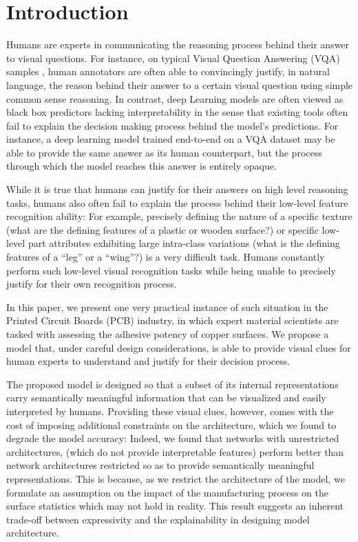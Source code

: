 \documentclass[10pt,twocolumn,letterpaper]{article}
\begin{document}
\section{Introduction}

Humans are experts in communicating the reasoning process behind their answer to visual questions.
For instance, on typical Visual Question Answering (VQA) samples \cite{agrawal:2015}\cite{zhang2016yin}\cite{goyal2017making}, 
human annotators are often able to convincingly justify, in natural language, the reason 
behind their answer to a certain visual question using simple common sense reasoning.
In contrast, deep Learning models are often viewed as black box predictors lacking interpretability 
in the sense that existing tools often fail to explain the decision making process behind the model’s predictions.
For instance, a deep learning model trained end-to-end on a VQA dataset may be able to provide the same answer as its
human counterpart, but the process through which the model reaches this answer is entirely opaque.

While it is true that humans can justify for their answers on high level reasoning tasks, 
humans also often fail to explain the process behind their low-level feature recognition ability:
For example, precisely defining the nature of a specific texture 
(what are the defining features of a plastic or wooden surface?) 
or specific low-level part attributes exhibiting large intra-class variations 
(what is the defining features of a ``leg'' or a ``wing''?) is a very difficult task.
Humans constantly perform such low-level visual recognition tasks 
while being unable to precisely justify for their own recognition process.
	
In this paper, we present one very practical instance of such situation in the Printed Circuit Boards (PCB) industry, 
in which expert material scientists are tasked with assessing the adhesive potency of copper surfaces.
We propose a model that, under careful design considerations, is able to provide visual clues 
for human experts to understand and justify for their decision process.
	
The proposed model is designed so that a subset of its internal representations carry semantically meaningful 
information that can be visualized and easily interpreted by humans.
Providing these visual clues, however, comes with the cost of imposing additional constraints on the architecture,
which we found to degrade the model accuracy:
Indeed, we found that networks with unrestricted architectures, 
(which do not provide interpretable features)
perform better than network architectures restricted so as to provide 
semantically meaningful representations.
This is because, as we restrict the architecture of the model, 
we formulate an assumption on the impact of the manufacturing process 
on the surface statistics which may not hold in reality.
This result suggests an inherent trade-off between  
expressivity and the explainability in designing model architecture.
	
\end{document}
